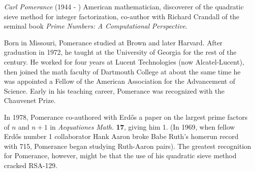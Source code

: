 \documentclass[12pt]{article}
\begin{document}
\emph{Carl Pomerance} (1944 - ) American mathematician, discoverer of the quadratic sieve method for integer factorization, co-author with Richard Crandall of the seminal book {\it Prime Numbers: A Computational Perspective}.

Born in Missouri, Pomerance studied at Brown and later Harvard. After graduation in 1972, he taught at the University of Georgia for the rest of the century. He worked for four years at Lucent Technologies (now Alcatel-Lucent), then joined the math faculty of Dartmouth College at about the same time he was appointed a Fellow of the American Association for the Advancement of Science. Early in his teaching career, Pomerance was recognized with the Chauvenet Prize.

In 1978, Pomerance co-authored with Erd\H{o}s a paper on the largest prime factors of $n$ and $n + 1$ in {\it Aequationes Math.} {\bf 17}, giving him  1. (In 1969, when fellow Erd\H{o}s number 1 collaborator Hank Aaron broke Babe Ruth's homerun record with 715, Pomerance began studying Ruth-Aaron pairs). The greatest recognition for Pomerance, however, might be that the use of his quadratic sieve method cracked RSA-129.
\end{document}
